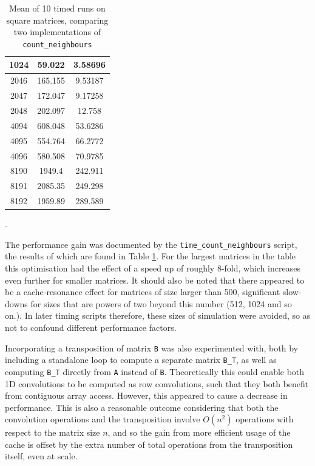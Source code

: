 \documentclass[12pt]{article}
\begin{document}
\begin{table}[hp]
{\begin{tabular}{| c | c | c |}
        1024 & 59.022      &    3.58696    \\
        \hline
        2046 & 165.155     &    9.53187    \\
        2047 & 172.047     &    9.17258    \\
        2048 & 202.097     &    12.758     \\
        \hline
        4094 & 608.048     &    53.6286    \\
        4095 & 554.764     &    66.2772    \\
        4096 & 580.508     &    70.9785    \\
        \hline
        8190 & 1949.4      &    242.911    \\
        8191 & 2085.35     &    249.298    \\
        8192 & 1959.89     &    289.589    \\
        \hline

    \end{tabular}
    }
    \caption{Mean of 10 timed runs on square matrices, comparing two implementations of \texttt{count\_neighbours}}.
    \label{tab:sepconvtime}
\end{table}

The performance gain was documented by the \texttt{time\_count\_neighbours} script, the results of which are found in Table \ref{tab:sepconvtime}.
For the largest matrices in the table this optimisation had the effect of a speed up of roughly 8-fold,
which increases even further for smaller matrices.
It should also be noted that there appeared to be a cache-resonance effect for matrices of size larger than 500,
significant slow-downs for sizes that are powers of two beyond this number (512, 1024 and so on.).
In later timing scripts therefore, these sizes of simulation were avoided, so as not to confound different performance factors.

Incorporating a transposition of matrix \texttt{B} was also experimented with, both by including a standalone loop to compute a separate matrix \texttt{B\_T},
as well as computing \texttt{B\_T} directly from \texttt{A} instead of \texttt{B}.
Theoretically this could enable both 1D convolutions to be computed as row convolutions,
such that they both benefit from contiguous array access.
However, this appeared to cause a decrease in performance.
This is also a reasonable outcome considering that both the convolution operations and the transposition involve $O(n^2)$ operations with respect to the matrix size $n$,
and so the gain from more efficient usage of the cache is offset by the extra number of total operations from the transposition itself, even at scale.
\end{document}
